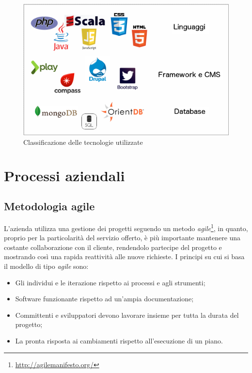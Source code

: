 \begin{figure}[h]
\centering
\includegraphics[width=0.8\linewidth]{immagini/White}
\caption[Classificazione delle tecnologie utilizzate]{Classificazione delle tecnologie utilizzate}
\label{fig:White}
\end{figure}

\newpage
\section{Processi aziendali}
\subsection{Metodologia agile}
L'azienda utilizza una gestione dei progetti seguendo un metodo \textit{agile}\footnote{\url{http://agilemanifesto.org/}}, in quanto, proprio per la particolarità del servizio offerto, è più importante mantenere una costante collaborazione con il cliente, rendendolo partecipe del progetto e mostrando così una rapida reattività alle nuove richieste. I principi su cui si basa il modello di tipo \textit{agile} sono:
\begin{itemize}
	\item Gli individui  e le iterazione rispetto ai processi  e agli strumenti;
	\item Software funzionante rispetto ad un'ampia documentazione;
	\item Committenti e sviluppatori devono lavorare insieme per tutta la durata del progetto;
	\item La pronta risposta ai cambiamenti rispetto all'esecuzione di un piano.
\end{itemize}

